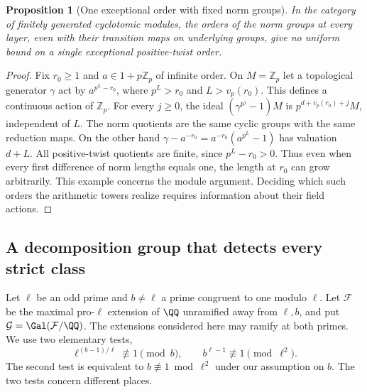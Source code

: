 \documentclass[a4paper,11pt]{article}
\newtheorem{proposition}{Proposition}[section]
\theoremstyle{definition}
\theoremstyle{remark}
\newcommand{\ZZ}{\mathbb Z}\newcommand{\ord}{\operatorname{ord}}
\numberwithin{equation}{section}
\begin{document}
\begin{proposition}[One exceptional order with fixed norm groups]\leavevmode\label{prop:normexample340}
In the category of finitely generated cyclotomic modules, the orders
of the norm groups at every layer, even with their transition maps on
underlying groups, give no uniform bound on a single exceptional
positive-twist order.
\end{proposition}
\begin{proof}
Fix $r_0\ge1$ and $a\in1+p\ZZ_p$ of infinite order. On $M=\ZZ_p$
let a topological generator $\gamma$ act by $a^{p^L-r_0}$, where
$p^L>r_0$ and $L>v_p(r_0)$. This defines a continuous action of
$\ZZ_p$. For every $j\ge0$, the ideal $(\gamma^{p^j}-1)M$ is
$p^{d+v_p(r_0)+j}M$, independent of $L$. The norm quotients are the
same cyclic groups with the same reduction maps. On the other hand
$\gamma-a^{-r_0}=a^{-r_0}(a^{p^L}-1)$ has valuation $d+L$. All
positive-twist quotients are finite, since $p^L-r_0>0$. Thus even
when every first difference of norm lengths equals one, the length
at $r_0$ can grow arbitrarily. This example concerns the module
argument. Deciding which such orders the arithmetic towers realize
requires information about their field actions.
\end{proof}


\subsection{A decomposition group that detects every strict class}\label{sec:localgeneration346}

Let $\ell$ be an odd prime and $b\ne\ell$ a prime congruent to one
modulo $\ell$. Let $\mathcal F$ be the maximal pro-$\ell$ extension
of $\QQ$ unramified away from $\ell,b$, and put
$\mathcal G=\Gal(\mathcal F/\QQ)$. The extensions considered here
may ramify at both primes. We use two elementary tests,
\begin{equation}\label{eq:localgeneration346}
 \ell^{(b-1)/\ell}\not\equiv1\pmod b,\qquad
 b^{\ell-1}\not\equiv1\pmod{\ell^2}.
\end{equation}
The second test is equivalent to $b\not\equiv1\bmod\ell^2$ under
our assumption on $b$. The two tests concern different places.
\end{document}
